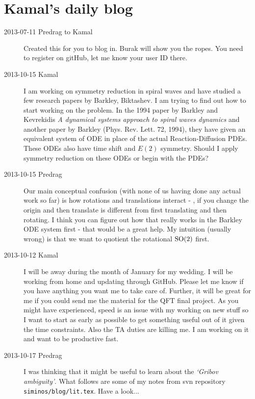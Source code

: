 
\chapter{Kamal's daily blog}
\label{c-dailyBlogKS}

\begin{description}
\item[2013-07-11  Predrag to Kamal] Created this for you to blog
in. Burak will show you the ropes. You need to register on gitHub, let me
know your user ID there.

\item[2013-10-15  Kamal] I am working on symmetry reduction in spiral waves and have studied a few research papers by Barkley, Biktashev. I am trying to find out how to start working on the problem. In the 1994 paper by Barkley and Kevrekidis {\em A dynamical systems approach to spiral waves dynamics} and another paper by Barkley (Phys. Rev. Lett. 72, 1994), they have given an equivalent system of ODE in place of the actual Reaction-Diffusion PDEs. These ODEs also have time shift and $E(2)$ symmetry. Should I apply symmetry reduction on these ODEs or begin with the PDEs?

\item[2013-10-15 Predrag] Our main conceptual confusion (with none of us having
done any actual work so far) is how rotations and translations interact - \ie, if you change the origin and then translate is different from first translating and then rotating. I think you can figure out how that really works in the Barkley ODE system first - that would be a great help. My intuition (usually wrong) is that we want to
quotient the rotational $\textrm{SO}(2)$ first.

\item[2013-10-12  Kamal] I will be away during the month of January for my wedding.
I will be working from home and updating through GitHub.
Please let me know if you have anything you want me to take care of.
Further, it will be great for me if you could send me the material
for the QFT final project. As you might have experienced, speed is
an issue with my working on new stuff so I want to start as early
as possible to get something useful out of it given the time constraints.
Also the TA duties are killing me. I am working on it and want to be productive fast.

\item[2013-10-17 Predrag] I was thinking that it might be useful to
learn about the \emph{`Gribov ambiguity'}.
What follows are some of my notes from
svn repository
\\
\texttt{siminos/blog/lit.tex}. Have a look...


\end{description}
